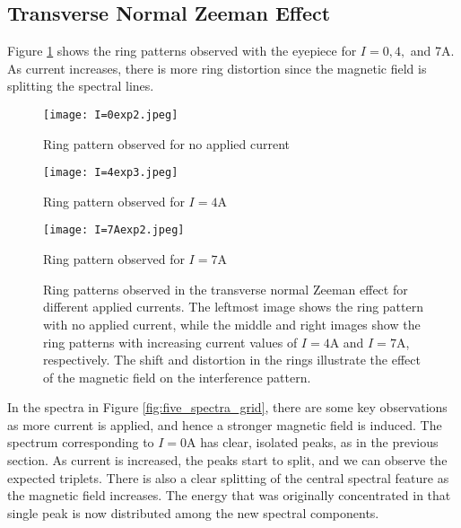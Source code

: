 \documentclass[11pt,twocolumn, a4paper]{article}
\numberwithin{equation}{section} %
\numberwithin{figure}{section} %
\numberwithin{table}{section} %
\begin{document}
\subsection{Transverse Normal Zeeman Effect}
Figure \ref{fig:three_diagrams} shows the ring patterns observed with the eyepiece for \(I=0,4,\) and 7A. As current increases, there is more ring distortion since the magnetic field is splitting the spectral lines. 
\begin{figure}[H]
    \centering
    \begin{minipage}{0.32\textwidth}
        \centering
        \texttt{[image: I=0exp2.jpeg]}
        \caption{Ring pattern observed for no applied current}
        \label{fig:ringsI0}
    \end{minipage}
    \hfill
    \begin{minipage}{0.32\textwidth}
        \centering
        \texttt{[image: I=4exp3.jpeg]}
        \caption{Ring pattern observed for \(I=4\)A}
        \label{fig:ringsI4}
    \end{minipage}
    \hfill
    \begin{minipage}{0.32\textwidth}
        \centering
        \texttt{[image: I=7Aexp2.jpeg]}
        \caption{Ring pattern observed for \(I=7\)A}
        \label{fig:ringsI7}
    \end{minipage}
    \caption{Ring patterns observed in the transverse normal Zeeman effect for different applied currents. The leftmost image shows the ring pattern with no applied current, while the middle and right images show the ring patterns with increasing current values of \(I=4\)A and \(I=7\)A, respectively. The shift and distortion in the rings illustrate the effect of the magnetic field on the interference pattern. }
    \label{fig:three_diagrams}
\end{figure}
In the spectra in Figure \ref{fig:five_spectra_grid}, there are some key observations as more current is applied, and hence a stronger magnetic field is induced.  The spectrum corresponding to \(I=0\)A has clear, isolated peaks, as in the previous section. As current is increased, the peaks start to split, and we can observe the expected triplets. There is also a clear splitting of the central spectral feature as the magnetic field increases. The energy that was originally concentrated in that single peak is now distributed among the new spectral components. 
\end{document}
